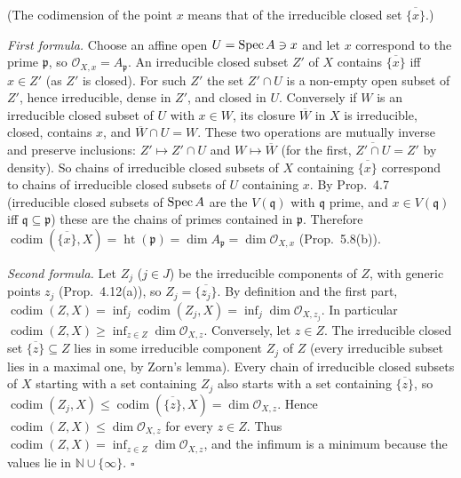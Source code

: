 \documentclass[11pt]{article}
\begin{document}
\pf
(The codimension of the point $x$ means that of the irreducible closed set $\overline{\{x\}}$.)

\emph{First formula.} Choose an affine open $U=\operatorname{Spec} A\ni x$ and let $x$ correspond to the prime $\mathfrak p$, so $\mathcal O_{X,x}=A_{\mathfrak p}$. An irreducible closed subset $Z'$ of $X$ contains $\overline{\{x\}}$ iff $x\in Z'$ (as $Z'$ is closed). For such $Z'$ the set $Z'\cap U$ is a non-empty open subset of $Z'$, hence irreducible, dense in $Z'$, and closed in $U$. Conversely if $W$ is an irreducible closed subset of $U$ with $x\in W$, its closure $\overline W$ in $X$ is irreducible, closed, contains $x$, and $\overline W\cap U=W$. These two operations are mutually inverse and preserve inclusions: $Z'\mapsto Z'\cap U$ and $W\mapsto\overline W$ (for the first, $\overline{Z'\cap U}=Z'$ by density). So chains of irreducible closed subsets of $X$ containing $\overline{\{x\}}$ correspond to chains of irreducible closed subsets of $U$ containing $x$. By Prop.~4.7 (irreducible closed subsets of $\operatorname{Spec} A$ are the $V(\mathfrak q)$ with $\mathfrak q$ prime, and $x\in V(\mathfrak q)$ iff $\mathfrak q\subseteq\mathfrak p$) these are the chains of primes contained in $\mathfrak p$. Therefore $\operatorname{codim}(\overline{\{x\}},X)=\operatorname{ht}(\mathfrak p)=\dim A_{\mathfrak p}=\dim\mathcal O_{X,x}$ (Prop.~5.8(b)).

\emph{Second formula.} Let $Z_j$ ($j\in J$) be the irreducible components of $Z$, with generic points $z_j$ (Prop.~4.12(a)), so $Z_j=\overline{\{z_j\}}$. By definition and the first part, $\operatorname{codim}(Z,X)=\inf_j\operatorname{codim}(Z_j,X)=\inf_j\dim\mathcal O_{X,z_j}$. In particular $\operatorname{codim}(Z,X)\ge\inf_{z\in Z}\dim\mathcal O_{X,z}$. Conversely, let $z\in Z$. The irreducible closed set $\overline{\{z\}}\subseteq Z$ lies in some irreducible component $Z_j$ of $Z$ (every irreducible subset lies in a maximal one, by Zorn's lemma). Every chain of irreducible closed subsets of $X$ starting with a set containing $Z_j$ also starts with a set containing $\overline{\{z\}}$, so $\operatorname{codim}(Z_j,X)\le\operatorname{codim}(\overline{\{z\}},X)=\dim\mathcal O_{X,z}$. Hence $\operatorname{codim}(Z,X)\le\dim\mathcal O_{X,z}$ for every $z\in Z$. Thus $\operatorname{codim}(Z,X)=\inf_{z\in Z}\dim\mathcal O_{X,z}$, and the infimum is a minimum because the values lie in $\mathbb N\cup\{\infty\}$. \hfill$\square$
\end{document}
